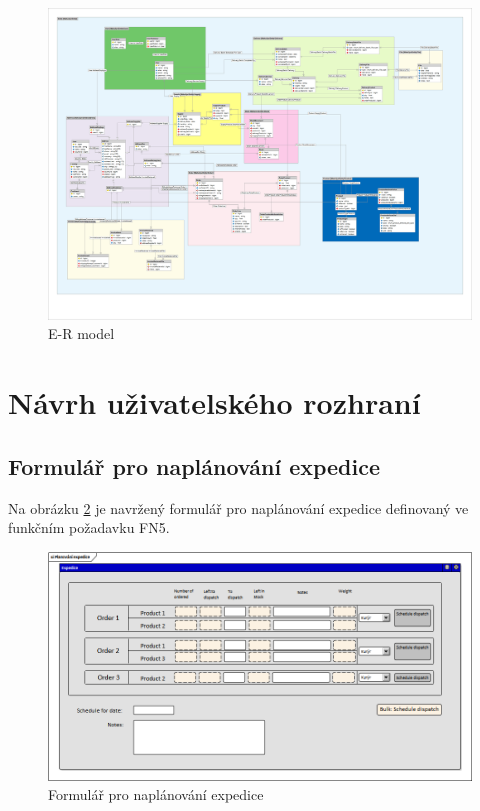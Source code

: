 \documentclass[thesis=B,czech]{FITthesis}[2012/06/26]
\begin{document}
\begin{figure}
	\includegraphics[width=500pt, height=\textwidth, angle=90]{mahasys_ermodel.png}
	\caption{E-R model}\label{er_model}
\end{figure}

\section{Návrh uživatelského rozhraní}

\subsection{Formulář pro naplánování expedice}
	Na obrázku \ref{expedice} je navržený formulář pro naplánování expedice definovaný ve funkčním požadavku FN5.

\begin{figure}
	\includegraphics[width=\textwidth]{expedition_plan.png}
	\caption{Formulář pro naplánování expedice}\label{expedice}
\end{figure}
\end{document}
